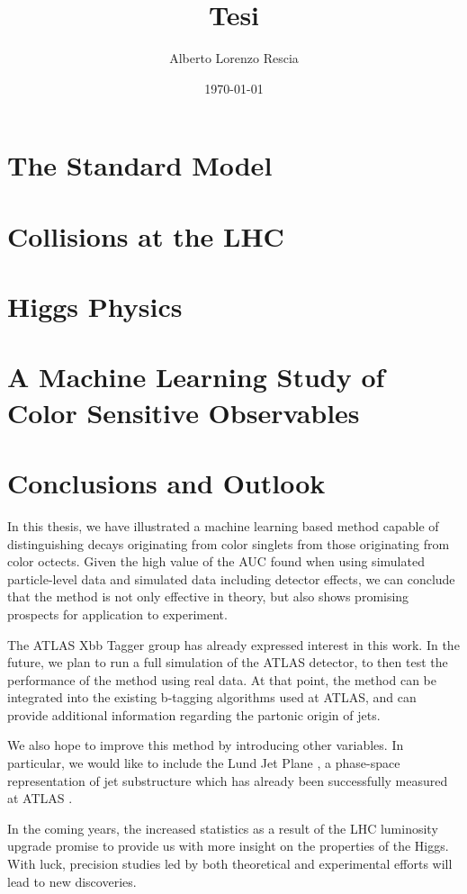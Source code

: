 \documentclass[10pt,a4paper]{book}
\title{Tesi}
\author{Alberto Lorenzo Rescia}
\date{\today}
\begin{document}
\tableofcontents

\chapter{The Standard Model}


\chapter{Collisions at the LHC}


\chapter{Higgs Physics}


\chapter{A Machine Learning Study of Color Sensitive Observables}


\chapter*{Conclusions and Outlook}

In this thesis, we have illustrated a machine learning based method capable of distinguishing decays originating from color singlets from those originating from color octects. Given the high value of the AUC found when using simulated particle-level data and simulated data including detector effects, we can conclude that the method is not only effective in theory, but also shows promising prospects for application to experiment. 

The ATLAS Xbb Tagger group has already expressed interest in this work. In the future, we plan to run a full simulation of the ATLAS detector, to then test the performance of the method using real data. At that point, the method can be integrated into the existing   b-tagging algorithms used at ATLAS, and can provide additional information regarding the partonic origin of jets.

We also hope to improve this method by introducing other variables. In particular, we would like to include the Lund Jet Plane \cite{Dreyer:2018nbf}, a phase-space representation of jet substructure which has already been successfully measured at ATLAS \cite{ATLAS:2020bbn}.

In the coming years, the increased statistics as a result of the LHC luminosity upgrade promise to provide us with more insight on the properties of the Higgs. With luck, precision studies led by both theoretical and experimental efforts will lead to new discoveries.




\end{document}
